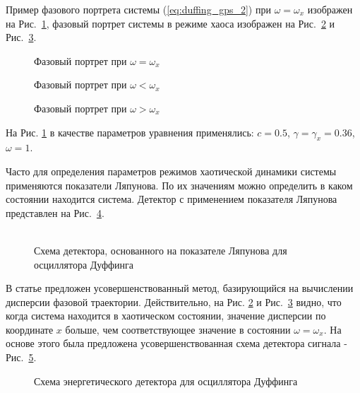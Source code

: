 Пример фазового портрета системы (\ref{eq:duffing_gps_2}) при ${\omega=\omega_{x}}$ изображен на \mbox{Рис. \ref{pic:duffing_sync}},
фазовый портрет системы в режиме хаоса изображен на \mbox{Рис. \ref{pic:duffing_chaos1}} и \mbox{Рис. \ref{pic:duffing_chaos2}}.
\begin{figure}[h]
	\center{}
	\caption{Фазовый портрет при ${\omega =\omega_{x}}$}
	\label{pic:duffing_sync}
\end{figure}
\begin{figure}[h]
	\center{}
	\caption{Фазовый портрет при ${\omega < \omega_{x}}$}
	\label{pic:duffing_chaos1}
\end{figure}
\begin{figure}[h]
	\center{}
	\caption{Фазовый портрет при ${\omega > \omega_{x}}$}
	\label{pic:duffing_chaos2}
\end{figure}
На Рис. \ref{pic:duffing_sync} в качестве параметров уравнения применялись: $c = 0.5$, $\gamma=\gamma_{x}=0.36$, ${\omega=1}$.

Часто для определения параметров режимов хаотической динамики системы применяются показатели Ляпунова.
По их значениям можно определить в каком состоянии находится система.
Детектор с применением показателя Ляпунова представлен на \mbox{Рис. \ref{pic:chaos_lyapunov}}.
\begin{figure}[h]
	\center{}
	\caption{\\Схема детектора, основанного на показателе Ляпунова для осциллятора Дуффинга}
	\label{pic:chaos_lyapunov}
\end{figure}

В статье \cite{chaos_chen} предложен усовершенствованный метод, базирующийся на вычислении дисперсии
фазовой траектории. Действительно, на Рис. \mbox{\ref{pic:duffing_chaos1}} и \mbox{Рис. \ref{pic:duffing_chaos2}} видно, что когда система находится в хаотическом состоянии, значение
дисперсии по координате ${x}$ больше, чем соответствующее значение в состоянии $\omega = \omega_{x}$.
На основе этого была предложена усовершенствованная схема детектора сигнала - \mbox{Рис. \ref{pic:chaos_energy_detector}}.
\begin{figure}[h]
	\center{}
	\caption{Схема энергетического детектора для осциллятора Дуффинга}
	\label{pic:chaos_energy_detector}
\end{figure}

